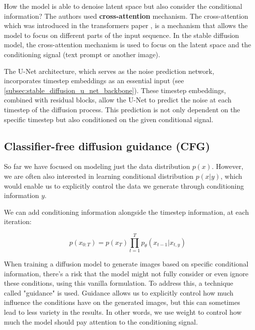 How the model is able to denoise latent space but also consider the conditional information? The authors used \textbf{cross-attention} mechanism. The cross-attention which was introduced in the transformers paper \cite{transformer}, is a mechanism that allows the model to focus on different parts of the input sequence. In the stable diffusion model, the cross-attention mechanism is used to focus on the latent space and the conditioning signal (text prompt or another image). 

The U-Net architecture, which serves as the noise prediction network, incorporates timestep embeddings as an essential input (see \ref{subsec:stable_diffusion_u_net_backbone}). These timestep embeddings, combined with residual blocks, allow the U-Net to predict the noise at each timestep of the diffusion process. This prediction is not only dependent on the specific timestep but also conditioned on the given conditional signal. 











\subsection{Classifier-free diffusion guidance (CFG)}

\label{subsec:classifier_free_diffusion_guidance}

So far we have focused on modeling just the data distribution $p(x)$. However, we are often also interested in learning conditional distribution $p(x|y)$, which would enable us to explicitly control the data we generate through conditioning information $y$.

We can add conditioning information alongside the timestep information, at each iteration:

\[
p(x_{0:T}) = p(x_T) \prod_{t=1}^{T} p_\theta (x_{t-1} | x_{t, y})
\]

When training a diffusion model to generate images based on specific conditional information, there's a risk that the model might not fully consider or even ignore these conditions, using this vanilla formulation. To address this, a technique called "guidance" is used. Guidance allows us to explicitly control how much influence the conditions have on the generated images, but this can sometimes lead to less variety in the results. In other words, we use weight to control how much the model should pay attention to the conditioning signal.

